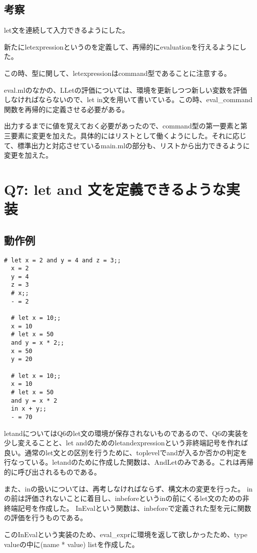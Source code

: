 \documentclass[uplatex,12pt]{jsarticle}
\begin{document}
\subsection{考察}

let文を連続して入力できるようにした。

新たにletexpressionというのを定義して、再帰的にevaluationを行えるようにした。

この時、型に関して、letexpressionはcommand型であることに注意する。

eval.mlのなかの、LLetの評価については、環境を更新しつつ新しい変数を評価しなければならないので、let in文を用いて書いている。この時、eval\_command関数を再帰的に定義させる必要がある。

出力するまでに値を覚えておく必要があったので、command型の第一要素と第三要素に変更を加えた。具体的にはリストとして働くようにした。それに応じて、標準出力と対応させているmain.mlの部分も、リストから出力できるように変更を加えた。

\section{Q7: let and 文を定義できるような実装}
\subsection{動作例}
\begin{lstlisting}[caption=動作例]
  # let x = 2 and y = 4 and z = 3;;
  x = 2
  y = 4
  z = 3
  # x;;
  - = 2

  # let x = 10;;
  x = 10
  # let x = 50
  and y = x * 2;;
  x = 50
  y = 20

  # let x = 10;;
  x = 10
  # let x = 50
  and y = x * 2
  in x + y;;
  - = 70
\end{lstlisting}

letandについてはQ6のlet文の環境が保存されないものであるので、Q6の実装を少し変えることと、let andのためのletandexpressionという非終端記号を作れば良い。通常のlet文との区別を行うために、toplevelでandが入るか否かの判定を行なっている。letandのために作成した関数は、AndLetのみである。これは再帰的に呼び出されるものである。


また、inの扱いについては、再考しなければならず、構文木の変更を行った。
inの前は評価されないことに着目し、inbeforeというinの前にくるlet文のための非終端記号を作成した。
InEvalという関数は、inbeforeで定義された型を元に関数の評価を行うものである。

このInEvalという実装のため、eval\_exprに環境を返して欲しかったため、type valueの中に(name * value) listを作成した。
\end{document}
